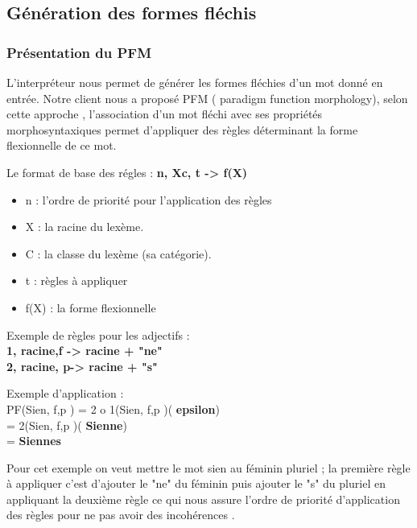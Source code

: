 \documentclass[12pt,a4paper]{article}
\begin{document}
\subsection{Génération des formes fléchis  }
\subsubsection{Présentation du PFM }
L'interpréteur  nous permet de générer les formes fléchies d'un mot donné en entrée. 
Notre client nous a proposé PFM ( paradigm function morphology), selon cette approche , l'association d'un mot fléchi avec ses propriétés morphosyntaxiques permet d'appliquer des règles déterminant la forme flexionnelle de ce mot.


      Le format de base des régles : \textbf{n, Xc, t -> f(X) } \\
\begin{itemize}
    \item n : l’ordre de priorité pour l’application des règles
    \item X : la racine du lexème.
    \item C : la classe du lexème (sa catégorie).
    \item t : règles à appliquer
    \item f(X) : la forme flexionnelle
\end{itemize}

Exemple de règles pour les adjectifs : \\
\textbf{1, racine,{f} -> racine + "ne"} \\
\textbf{2, racine, {p}-> racine + "s"}

Exemple d'application : \\
PF(Sien, {f,p} ) = 2 o 1(Sien, {f,p} )(\textbf{ epsilon}) \\
                 = 2(Sien, {f,p} )(\textbf{ Sienne}) \\
                 =\textbf{ Siennes }

Pour cet exemple on veut mettre le mot sien au féminin pluriel ; la première règle à appliquer c'est d'ajouter le "ne" du féminin puis ajouter le "s" du pluriel en appliquant la deuxième règle ce qui nous assure l'ordre de priorité d'application des règles pour ne pas avoir des incohérences .
\end{document}
